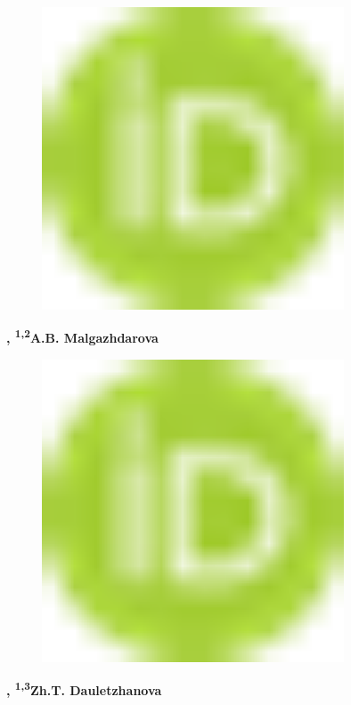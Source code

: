\begin{figure}[H]
	\centering
	\includegraphics[width=0.8\textwidth]{media/chem2/image1}
	\caption*{}
\end{figure}
{\bfseries ,
\textsuperscript{1,2}A.B. Malgazhdarova}

\begin{figure}[H]
	\centering
	\includegraphics[width=0.8\textwidth]{media/chem2/image1}
	\caption*{}
\end{figure}
{\bfseries ,
\textsuperscript{1,3}Zh.T. Dauletzhanova}

